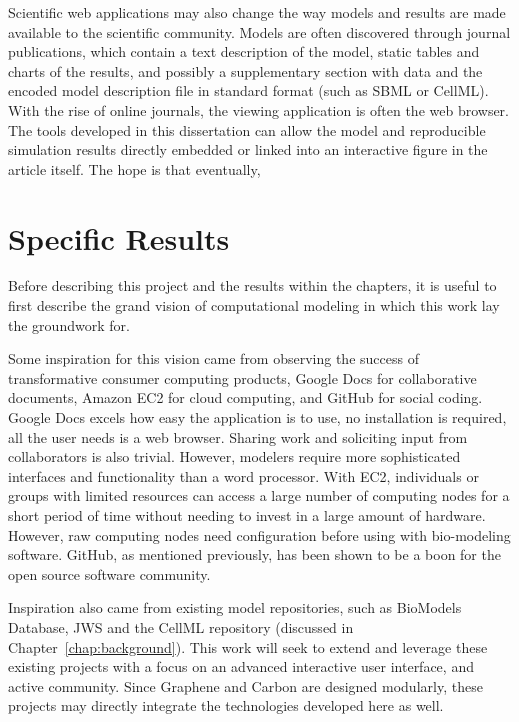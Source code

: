 Scientific web applications may also change the way models and results are made available to the scientific community.
Models are often discovered through journal publications, which contain a text description of the model, static tables and charts of the results, and possibly a supplementary section with data and the encoded model description file in standard format (such as SBML or CellML).
With the rise of online journals, the viewing application is often the web browser.
The tools developed in this dissertation can allow the model and reproducible simulation results directly embedded or linked into an interactive figure in the article itself.
The hope is that eventually, 

\section{Specific Results}

Before describing this project and the results within the chapters, it is useful to first describe the grand vision of computational modeling in which this work lay the groundwork for.

Some inspiration for this vision came from observing the success of transformative consumer computing products, Google Docs for collaborative documents, Amazon EC2 for cloud computing, and GitHub for social coding.
Google Docs excels how easy the application is to use, no installation is required, all the user needs is a web browser.
Sharing work and soliciting input from collaborators is also trivial.
However, modelers require more sophisticated interfaces and functionality than a word processor.
With EC2, individuals or groups with limited resources can access a large number of computing nodes for a short period of time without needing to invest in a large amount of hardware.
However, raw computing nodes need configuration before using with bio-modeling software.
GitHub, as mentioned previously, has been shown to be a boon for the open source software community.

Inspiration also came from existing model repositories, such as BioModels Database, JWS and the CellML repository (discussed in Chapter~\ref{chap:background}).
This work will seek to extend and leverage these existing projects with a focus on an advanced interactive user interface, and active community.
Since Graphene and Carbon are designed modularly, these projects may directly integrate the technologies developed here as well.

